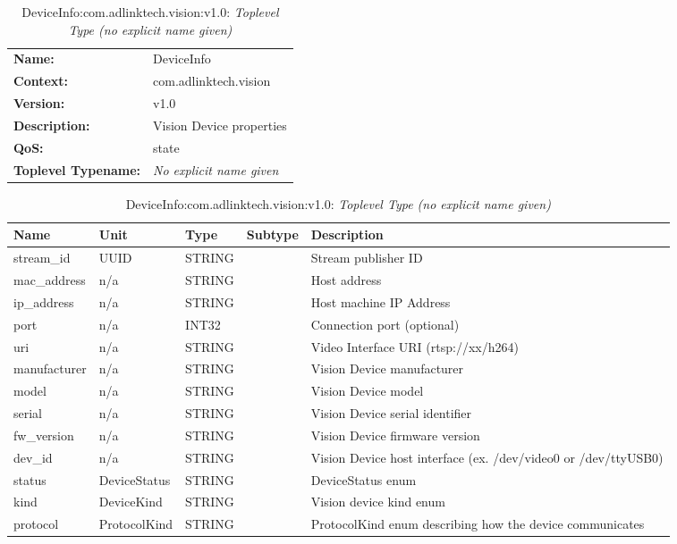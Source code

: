 \begin{table}[H]
\begin{tabularx}{\textwidth}{l X} 
       \textbf{Name:} & DeviceInfo \\ 
	   \textbf{Context:} & com.adlinktech.vision \\ 
	   \textbf{Version:} & v1.0 \\ 
	   \textbf{Description:} & Vision Device properties \\ 
	   \textbf{QoS:} & state \\
	   \textbf{Toplevel Typename:} & \textit{No explicit name given} \\ 
\end{tabularx}
\caption{DeviceInfo:com.adlinktech.vision:v1.0}\label{DeviceInfoTagGroup.json:table:DeviceInfo}
\bigskip
\begin{tabularx}{\textwidth}{l l l l X} 
	 \textbf{Name} & \textbf{Unit} & \textbf{Type} & \textbf{Subtype} & \textbf{Description} \\
	 \midrule
   stream\_id & UUID & STRING &  & Stream publisher ID \\
   mac\_address & n/a & STRING &  & Host address \\
   ip\_address & n/a & STRING &  & Host machine IP Address \\
   port & n/a & INT32 &  & Connection port (optional) \\
   uri & n/a & STRING &  & Video Interface URI (rtsp://xx/h264) \\
   manufacturer & n/a & STRING &  & Vision Device manufacturer \\
   model & n/a & STRING &  & Vision Device model \\
   serial & n/a & STRING &  & Vision Device serial identifier \\
   fw\_version & n/a & STRING &  & Vision Device firmware version \\
   dev\_id & n/a & STRING &  & Vision Device host interface (ex. /dev/video0 or /dev/ttyUSB0) \\
   status & DeviceStatus & STRING &  & DeviceStatus enum \\
   kind & DeviceKind & STRING &  & Vision device kind enum \\
   protocol & ProtocolKind & STRING &  & ProtocolKind enum describing how the device communicates \\
\end{tabularx}
\caption{DeviceInfo:com.adlinktech.vision:v1.0: \textit{Toplevel Type (no explicit name given)}}\label{DeviceInfoTagGroup.json:table:DeviceInfo-no-type-given}


\end{table}

